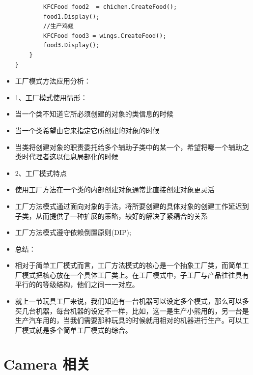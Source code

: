 \documentclass[9pt, b5paper]{article}
\begin{document}
\begin{itemize}
\begin{verbatim}
        KFCFood food2  = chichen.CreateFood();
        food1.Display();
        //生产鸡翅
        KFCFood food3 = wings.CreateFood();
        food3.Display();
    }
}
\end{verbatim}
\item 工厂模式方法应用分析：
\item 1、工厂模式使用情形：
\item 当一个类不知道它所必须创建的对象的类信息的时候
\item 当一个类希望由它来指定它所创建的对象的时候
\item 当类将创建对象的职责委托给多个辅助子类中的某一个，希望将哪一个辅助之类时代理者这以信息局部化的时候
\item 2、工厂模式特点
\item 使用工厂方法在一个类的内部创建对象通常比直接创建对象更灵活
\item 工厂方法模式通过面向对象的手法，将所要创建的具体对象的创建工作延迟到子类，从而提供了一种扩展的策略，较好的解决了紧耦合的关系
\item 工厂方法模式遵守依赖倒置原则(DIP);
\item 总结：
\item 相对于简单工厂模式而言，工厂方法模式的核心是一个抽象工厂类，而简单工厂模式把核心放在一个具体工厂类上。在工厂模式中，子工厂与产品往往具有平行的的等级结构，他们之间一一对应。
\item 就上一节玩具工厂来说，我们知道有一台机器可以设定多个模式，那么可以多买几台机器，每台机器的设定不一样，比如，这一是生产小熊用的，另一台是生产汽车用的，当我们需要那种玩具的时候就用相对的机器进行生产。可以工厂模式就是多个简单工厂模式的综合。
\end{itemize}
\section{Camera 相关}
\label{sec:org1b8f1b3}
\end{document}
